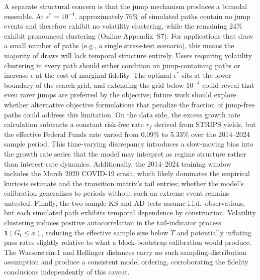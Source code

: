 A separate structural concern is that the jump mechanism produces a bimodal ensemble. At $\epsilon^{*}=10^{-4}$, approximately 76\% of simulated paths contain no jump events and therefore exhibit no volatility clustering, while the remaining 24\% exhibit pronounced clustering (Online Appendix~S7). For applications that draw a small number of paths (e.g., a single stress-test scenario), this means the majority of draws will lack temporal structure entirely. Users requiring volatility clustering in every path should either condition on jump-containing paths or increase $\epsilon$ at the cost of marginal fidelity. The optimal $\epsilon^{*}$ sits at the lower boundary of the search grid, and extending the grid below $10^{-4}$ could reveal that even rarer jumps are preferred by the objective; future work should explore whether alternative objective formulations that penalize the fraction of jump-free paths could address this limitation. On the data side, the excess growth rate calculation subtracts a constant risk-free rate $r_f$ derived from STRIPS yields, but the effective Federal Funds rate varied from 0.09\% to 5.33\% over the 2014--2024 sample period. This time-varying discrepancy introduces a slow-moving bias into the growth rate series that the model may interpret as regime structure rather than interest-rate dynamics. Additionally, the 2014--2024 training window includes the March 2020 COVID-19 crash, which likely dominates the empirical kurtosis estimate and the transition matrix's tail entries; whether the model's calibration generalizes to periods without such an extreme event remains untested. Finally, the two-sample KS and AD tests assume i.i.d.\ observations, but each simulated path exhibits temporal dependence by construction. Volatility clustering induces positive autocorrelation in the tail-indicator process $\mathbf{1}(G_t \le x)$, reducing the effective sample size below $T$ and potentially inflating pass rates slightly relative to what a block-bootstrap calibration would produce. The Wasserstein-1 and Hellinger distances carry no such sampling-distribution assumption and produce a consistent model ordering, corroborating the fidelity conclusions independently of this caveat.
